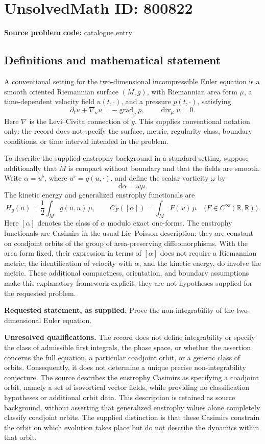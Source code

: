 \documentclass[11pt]{article}
\newcommand{\R}{\mathbb{R}}
\begin{document}
\section*{UnsolvedMath ID: 800822}
\textbf{Source problem code:} catalogue entry
\subsection{Definitions and mathematical statement}
A conventional setting for the two-dimensional incompressible Euler equation is a smooth oriented Riemannian surface \((M,g)\), with Riemannian area form \(\mu\), a time-dependent velocity field \(u(t,\cdot)\), and a pressure \(p(t,\cdot)\), satisfying
\[
\partial_t u+\nabla_u u=-\operatorname{grad}_g p,
\qquad \operatorname{div}_{\mu}u=0.
\]
Here \(\nabla\) is the Levi--Civita connection of \(g\). This supplies conventional notation only: the record does not specify the surface, metric, regularity class, boundary conditions, or time interval intended in the problem.

To describe the supplied enstrophy background in a standard setting, suppose additionally that \(M\) is compact without boundary and that the fields are smooth. Write \(\alpha=u^{\flat}\), where \(u^{\flat}=g(u,\cdot)\), and define the scalar vorticity \(\omega\) by
\[
\mathrm d\alpha=\omega\mu.
\]
The kinetic energy and generalized enstrophy functionals are
\[
H_g(u)=\frac12\int_M g(u,u)\,\mu,
\qquad
C_F([\alpha])=\int_M F(\omega)\,\mu
\quad\bigl(F\in C^{\infty}(\R,\R)\bigr).
\]
Here \([\alpha]\) denotes the class of \(\alpha\) modulo exact one-forms. The enstrophy functionals are Casimirs in the usual Lie--Poisson description: they are constant on coadjoint orbits of the group of area-preserving diffeomorphisms. With the area form fixed, their expression in terms of \([\alpha]\) does not require a Riemannian metric; the identification of velocity with \(\alpha\), and the kinetic energy, do involve the metric. These additional compactness, orientation, and boundary assumptions make this explanatory framework explicit; they are not hypotheses supplied for the requested problem.

\textbf{Requested statement, as supplied.} Prove the non-integrability of the two-dimensional Euler equation.

\textbf{Unresolved qualifications.} The record does not define integrability or specify the class of admissible first integrals, the phase space, or whether the assertion concerns the full equation, a particular coadjoint orbit, or a generic class of orbits. Consequently, it does not determine a unique precise non-integrability conjecture. The source describes the enstrophy Casimirs as specifying a coadjoint orbit, namely a set of isovortical vector fields, while providing no classification hypotheses or additional orbit data. This description is retained as source background, without asserting that generalized enstrophy values alone completely classify coadjoint orbits. The supplied distinction is that these Casimirs constrain the orbit on which evolution takes place but do not describe the dynamics within that orbit.
\end{document}
